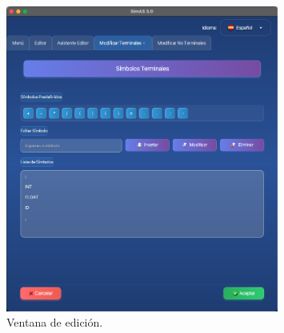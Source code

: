 \begin{figure}[htp]
\centering
	\includegraphics[width=0.8\textwidth]{figuras2/editor/panel_terminales.png}
	\caption{Ventana de edición.}
	\label{fig:d9}
\end{figure}